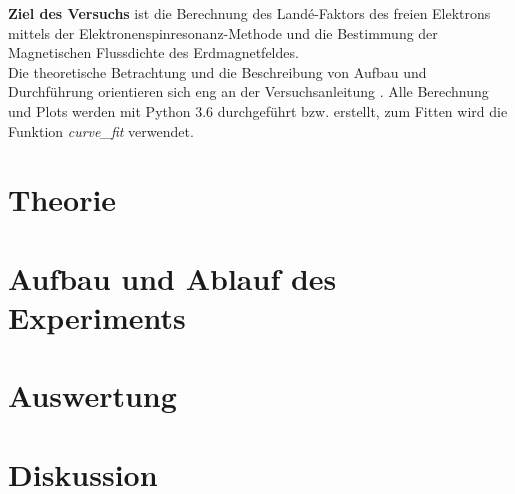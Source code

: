 \documentclass[a4,11pt]{article}
\newcommand{\V}{V28}
\begin{document}



\tableofcontents
\clearpage

\textbf{Ziel des Versuchs} ist die Berechnung des Landé-Faktors des freien Elektrons mittels der Elektronenspinresonanz-Methode und die Bestimmung der Magnetischen Flussdichte des Erdmagnetfeldes. \\
Die theoretische Betrachtung und die Beschreibung von Aufbau und Durchführung orientieren sich eng an der Versuchsanleitung \cite{V28}. Alle Berechnung und Plots werden mit Python 3.6 durchgeführt bzw. erstellt, zum Fitten wird die Funktion \textit{curve\_fit} verwendet.


\section{Theorie}

\clearpage


\section{Aufbau und Ablauf des Experiments}

\clearpage


\section{Auswertung}

\clearpage


\section{Diskussion}


\clearpage
\listoftodos
\listoffigures
\listoftables
\clearpage
\nocite{\V}
\printbibliography[title = Literaturverzeichnis]
\end{document}
